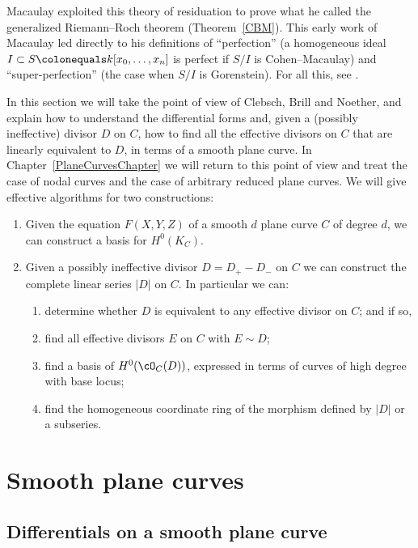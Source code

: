 Macaulay exploited this theory of
residuation
%
to prove what he called
the generalized Riemann--Roch theorem
%
(Theorem~\ref{CBM}). This
early work of Mac\-aulay led directly to his definitions of
%
``perfection'' (a homogeneous ideal
$I  \subset S\colonequals k[x_0, \dots, x_n]$ is perfect if $S/I$ is
Cohen--Macaulay)
%
and ``super-perfection'' (the case when $S/I$ is
%
%
Gorenstein). For all this, see \cite{eisenbud-gray}.

In this section we will take the point of view of Clebsch, Brill and Noether, and explain how to understand
the differential forms and, given a (possibly ineffective) divisor $D$ on $C$, how to find all the
effective divisors on $C$ that are linearly equivalent to $D$, in terms of a smooth plane curve. In Chapter~\ref{PlaneCurvesChapter} we will return to this point of view and treat the case of
nodal curves and the case of arbitrary reduced plane curves. We will give effective algorithms for
two constructions:

\begin{enumerate}
\item Given the equation $F(X,Y,Z)$ of a smooth $d$ plane curve $C$
of degree $d$, we can
construct a basis for $H^0(K_C)$.
\item  Given a possibly ineffective divisor $D = D_{+}-D_{-}$ on $C$ we can construct the complete linear series $|D|$ on $C$. In particular we can:
\begin{enumerate}
\item determine whether $D$ is equivalent to any effective divisor on $C$; and if so,
 \item find all effective divisors $E$ on $C$ with $E \sim D$;
 \item find a basis of $H^0(\cO_C(D))$, expressed in terms of curves of high degree with
%
base locus;
 \item find the homogeneous coordinate ring of the morphism defined by $|D|$ or a subseries.
\end{enumerate}
\end{enumerate}

\section{Smooth plane curves}\label{smooth plane curves}

\subsection{Differentials on a smooth plane curve}\label{canonical series on smooth plane curves}


